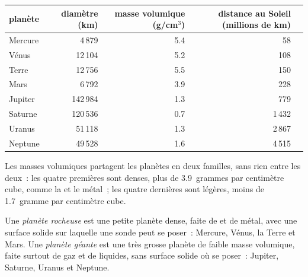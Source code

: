 \begin{center}
\small
\begin{tabular}{lrrrr}
\hline
planète & diamètre (km) & masse volumique (g/cm$^3$) & distance au Soleil (millions de km)\\
\hline
Mercure & 4\,879 & 5.4 & 58\\
Vénus & 12\,104 & 5.2 & 108\\
Terre & 12\,756 & 5.5 & 150\\
Mars & 6\,792 & 3.9 & 228\\
\hline
Jupiter & 142\,984 & 1.3 & 779\\
Saturne & 120\,536 & 0.7 & 1\,432\\
Uranus & 51\,118 & 1.3 & 2\,867\\
Neptune & 49\,528 & 1.6 & 4\,515\\
\hline
\end{tabular}
\end{center}

Les masses volumiques partagent les planètes en deux familles, sans rien
entre les deux~: les quatre premières sont denses, plus de 3.9~grammes par
centimètre cube, comme la  et le métal~; les quatre dernières sont
légères, moins de 1.7~gramme par centimètre cube.

\begin{definition}\label{def:g6:earth-a-planet:planet-types}
Une \emph{planète rocheuse} est
une petite planète dense, faite de  et de métal, avec une surface
solide sur laquelle une sonde peut se poser~: Mercure, Vénus, la Terre et
Mars. Une \emph{planète géante} est une
très grosse planète de faible masse volumique, faite surtout de gaz et de
liquides, sans surface solide où se poser~: Jupiter, Saturne, Uranus et
Neptune.
\end{definition}

